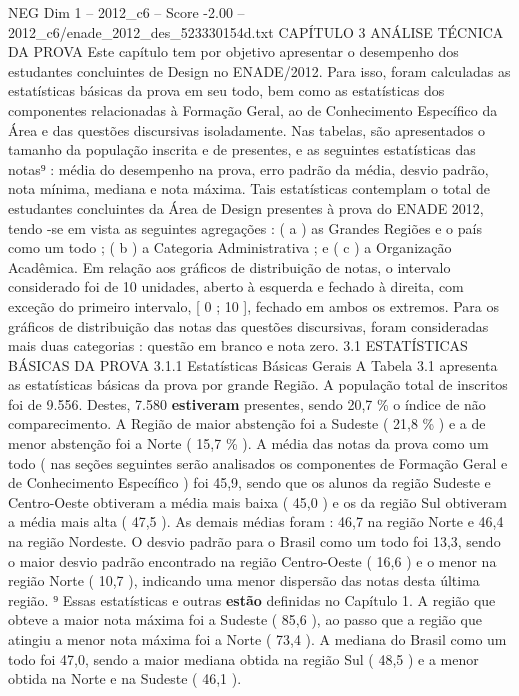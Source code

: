 \begin{textsample}{NEG Dim 1 – 2012\_c6 – Score -2.00 – 2012\_c6/enade\_2012\_des\_523330154d.txt}  \label{ex:f1_neg_256}
CAPÍTULO 3 ANÁLISE TÉCNICA DA PROVA Este capítulo tem por objetivo apresentar o desempenho dos estudantes concluintes de Design no ENADE/2012.
Para isso, foram calculadas as estatísticas básicas da prova em seu todo, bem como as estatísticas dos componentes relacionadas à Formação Geral, ao de Conhecimento Específico da Área e das questões discursivas isoladamente.
Nas tabelas, são apresentados o tamanho da população inscrita e de presentes, e as seguintes estatísticas das notas⁹ : média do desempenho na prova, erro padrão da média, desvio padrão, nota mínima, mediana e nota máxima.
Tais estatísticas contemplam o total de estudantes concluintes da Área de Design presentes à prova do ENADE 2012, tendo -se em vista as seguintes agregações : ( a ) as Grandes Regiões e o país como um todo ; ( b ) a Categoria Administrativa ; e ( c ) a Organização Acadêmica.
Em relação aos gráficos de distribuição de notas, o intervalo considerado foi de 10 unidades, aberto à esquerda e fechado à direita, com exceção do primeiro intervalo, [ 0 ; 10 ], fechado em ambos os extremos.
Para os gráficos de distribuição das notas das questões discursivas, foram consideradas mais duas categorias : questão em branco e nota zero. 3.1 ESTATÍSTICAS BÁSICAS DA PROVA 3.1.1 Estatísticas Básicas Gerais A Tabela 3.1 apresenta as estatísticas básicas da prova por grande Região.
A população total de inscritos foi de 9.556.
Destes, 7.580 \textbf{estiveram} presentes, sendo 20,7 \% o índice de não comparecimento.
A Região de maior abstenção foi a Sudeste ( 21,8 \% ) e a de menor abstenção foi a Norte ( 15,7 \% ).
A média das notas da prova como um todo ( nas seções seguintes serão analisados os componentes de Formação Geral e de Conhecimento Específico ) foi 45,9, sendo que os alunos da região Sudeste e Centro-Oeste obtiveram a média mais baixa ( 45,0 ) e os da região Sul obtiveram a média mais alta ( 47,5 ).
As demais médias foram : 46,7 na região Norte e 46,4 na região Nordeste.
O desvio padrão para o Brasil como um todo foi 13,3, sendo o maior desvio padrão encontrado na região Centro-Oeste ( 16,6 ) e o menor na região Norte ( 10,7 ), indicando uma menor dispersão das notas desta última região. ⁹ Essas estatísticas e outras \textbf{estão} definidas no Capítulo 1.
A região que obteve a maior nota máxima foi a Sudeste ( 85,6 ), ao passo que a região que atingiu a menor nota máxima foi a Norte ( 73,4 ).
A mediana do Brasil como um todo foi 47,0, sendo a maior mediana obtida na região Sul ( 48,5 ) e a menor obtida na Norte e na Sudeste ( 46,1 ).

\end{textsample}
